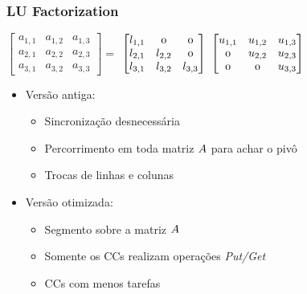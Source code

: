 \documentclass[xcolor={table}]{beamer}
\begin{document}
\begin{frame}\frametitle{LU Factorization}
	\begin{center}
    $\begin{bmatrix}
  	a_{1,1} & a_{1,2} & a_{1,3} \\
  	a_{2,1} & a_{2,2} & a_{2,3} \\
  	a_{3,1} & a_{3,2} & a_{3,3}   
    \end{bmatrix} =$
    $\begin{bmatrix}
  	l_{1,1} & \mathnormal{0} & \mathnormal{0} \\
  	l_{2,1} & l_{2,2} & \mathnormal{0} \\
  	l_{3,1} & l_{3,2} & l_{3,3}   
    \end{bmatrix}$
    $\begin{bmatrix}
  	u_{1,1} & u_{1,2} & u_{1,3} \\
  	\mathnormal{0} & u_{2,2} & u_{2,3} \\
  	\mathnormal{0} & \mathnormal{0} & u_{3,3}   
    \end{bmatrix}$
	\end{center}
    \begin{itemize}
    \item{Versão antiga:}
    	\begin{itemize}
    		\item Sincronização desnecessária
    		\item Percorrimento em toda matriz $\mathnormal{A}$ para achar o pivô
    		\item Trocas de linhas e colunas
    	\end{itemize}
    	\item{Versão otimizada:}
    	\begin{itemize}
    		\item Segmento sobre a matriz $\mathnormal{A}$
    		\item Somente os CCs realizam operações \textit{Put/Get}
    		\item CCs com menos tarefas
    	\end{itemize}
    \end{itemize}
\end{frame}
\end{document}
